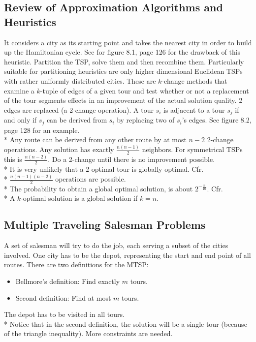 \documentclass[12pt]{book}
\newcounter{subsubsubsection}[subsubsection]
\begin{document}
\subsection{Review of Approximation Algorithms and Heuristics}
It considers a city as its starting point and takes the nearest city in order to build up the Hamiltonian cycle. See for figure 8.1, page 126 for the drawback of this heuristic.
Partition the TSP, solve them and then recombine them. Particularly suitable for partitioning heuristics are only higher dimensional Euclidean TSPs with rather uniformly distributed cities.
These are $k$-change methods that examine a $k$-tuple of edges of a given tour and test whether or not a replacement of the tour segments effects in an improvement of the actual solution quality.
2 edges are replaced (a 2-change operation). A tour $s_i$ is adjacent to a tour $s_j$ if and only if $s_j$ can be derived from $s_i$ by replacing two of $s_i$'s edges. See figure 8.2, page 128 for an example.\\*
Any route can be derived from any other route by at most $n-2$ 2-change operations. Any solution has exactly $\frac{n(n-1)}{2}$ neighbors. For symmetrical TSPs this is $\frac{n(n-2)}{2}$. Do a 2-change until there is no improvement possible.\\*
It is very unlikely that a 2-optimal tour is globally optimal.
Cfr.\\*
$\frac{n(n-1)(n-2)}{2}$ operations are possible.\\*
The probability to obtain a global optimal solution, is about $2^{-\frac{n}{10}}$.
Cfr.\\*
A $k$-optimal solution is a global solution if $k = n$.
\subsection{Multiple Traveling Salesman Problems}
A set of salesman will try to do the job, each serving a subset of the cities involved. One city has to be the depot, representing the start and end point of all routes. There are two definitions for the MTSP:
\begin{itemize}
\item Bellmore's definition: Find exactly $m$ tours.
\item Second definition: Find at most $m$ tours.
\end{itemize}
The depot has to be visited in all tours.\\*
Notice that in the second definition, the solution will be a single tour (because of the triangle inequality). More constraints are needed.
\end{document}
